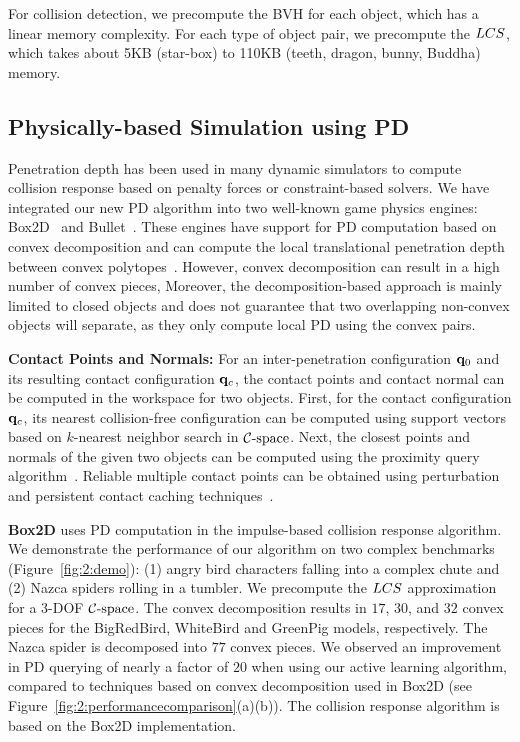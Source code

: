 For collision detection, we precompute the BVH for each object, which has a linear memory complexity. For each type of object pair, we precompute the $LCS$, which takes about 5KB (star-box) to 110KB (teeth, dragon, bunny, Buddha) memory.





\subsection{Physically-based Simulation using PD}
Penetration depth has been used in many dynamic simulators to compute collision response based on penalty forces or constraint-based solvers.
We have integrated our new PD algorithm into two well-known game physics
engines: Box2D~\cite{Erin:2012:Box2D} and Bullet~\cite{Erwin:2012:Bullet}. These engines have support for PD computation based on
convex decomposition and can compute the local translational penetration depth between convex polytopes~\cite{Gino:2001:GDC}.
However, convex decomposition can result in a high number of convex pieces, Moreover, the decomposition-based approach is mainly limited to closed
objects and does not guarantee that two
overlapping non-convex objects will separate, as they only compute local PD using the convex pairs.

\textbf{Contact Points and Normals:} For an inter-penetration configuration $\mathbf q_0$ and its resulting contact configuration $\mathbf q_c$, the contact points and contact normal can be computed in the workspace for two objects. First, for the contact configuration $\mathbf q_c$, its nearest collision-free configuration can be computed using support vectors based on $k$-nearest neighbor search in $\mathcal C\text{-space}$. Next, the closest points and normals of the given two objects can be computed using the proximity query algorithm~\cite{LGLM00}. Reliable multiple contact points can be obtained using perturbation and persistent contact caching techniques~\cite{Erwin:2012:Bullet}.

\textbf{Box2D} uses PD computation in the impulse-based collision response algorithm.
We demonstrate the performance of our algorithm on
two complex benchmarks (Figure~\ref{fig:2:demo}): (1) angry bird characters falling into a complex chute and (2) Nazca spiders rolling in a tumbler. We precompute the $LCS$ approximation for a 3-DOF $\mathcal C\text{-space}$.
The convex decomposition results in $17$, $30$, and $32$ convex pieces for the BigRedBird, WhiteBird and GreenPig models, respectively. The Nazca spider is decomposed into $77$ convex pieces. We observed an improvement in PD querying of nearly a factor of $20$ when using our active learning algorithm, compared to
techniques based on convex decomposition used in Box2D (see Figure~\ref{fig:2:performancecomparison}(a)(b)). The collision response algorithm is based on the Box2D implementation.


